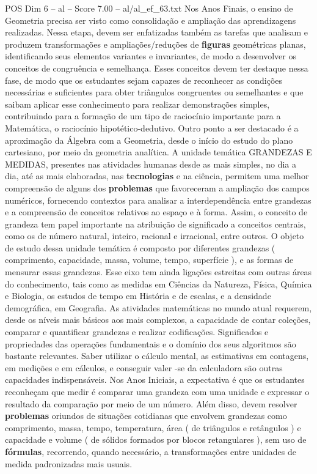 \begin{textsample}{POS Dim 6 – al – Score 7.00 – al/al\_ef\_63.txt}
Nos Anos Finais, o ensino de Geometria precisa ser visto como consolidação e ampliação das aprendizagens realizadas.
Nessa etapa, devem ser enfatizadas também as tarefas que analisam e produzem transformações e ampliações/reduções de \textbf{figuras} geométricas planas, identificando seus elementos variantes e invariantes, de modo a desenvolver os conceitos de congruência e semelhança.
Esses conceitos devem ter destaque nessa fase, de modo que os estudantes sejam capazes de reconhecer as condições necessárias e suficientes para obter triângulos congruentes ou semelhantes e que saibam aplicar esse conhecimento para realizar demonstrações simples, contribuindo para a formação de um tipo de raciocínio importante para a Matemática, o raciocínio hipotético-dedutivo.
Outro ponto a ser destacado é a aproximação da Álgebra com a Geometria, desde o início do estudo do plano cartesiano, por meio da geometria analítica.
A unidade temática GRANDEZAS E MEDIDAS, presentes nas atividades humanas desde as mais simples, no dia a dia, até as mais elaboradas, nas \textbf{tecnologias} e na ciência, permitem uma melhor compreensão de alguns dos \textbf{problemas} que favoreceram a ampliação dos campos numéricos, fornecendo contextos para analisar a interdependência entre grandezas e a compreensão de conceitos relativos ao espaço e à forma.
Assim, o conceito de grandeza tem papel importante na atribuição de significado a conceitos centrais, como os de número natural, inteiro, racional e irracional, entre outros.
O objeto de estudo dessa unidade temática é composto por diferentes grandezas ( comprimento, capacidade, massa, volume, tempo, superfície ), e as formas de mensurar essas grandezas.
Esse eixo tem ainda ligações estreitas com outras áreas do conhecimento, tais como as medidas em Ciências da Natureza, Física, Química e Biologia, os estudos de tempo em História e de escalas, e a densidade demográfica, em Geografia.
As atividades matemáticas no mundo atual requerem, desde os níveis mais básicos aos mais complexos, a capacidade de contar coleções, comparar e quantificar grandezas e realizar codificações.
Significados e propriedades das operações fundamentais e o domínio dos seus algoritmos são bastante relevantes.
Saber utilizar o cálculo mental, as estimativas em contagens, em medições e em cálculos, e conseguir valer -se da calculadora são outras capacidades indispensáveis.
Nos Anos Iniciais, a expectativa é que os estudantes reconheçam que medir é comparar uma grandeza com uma unidade e expressar o resultado da comparação por meio de um número.
Além disso, devem resolver \textbf{problemas} oriundos de situações cotidianas que envolvem grandezas como comprimento, massa, tempo, temperatura, área ( de triângulos e retângulos ) e capacidade e volume ( de sólidos formados por blocos retangulares ), sem uso de \textbf{fórmulas}, recorrendo, quando necessário, a transformações entre unidades de medida padronizadas mais usuais.

\end{textsample}
